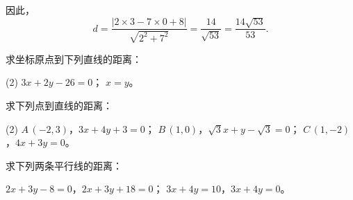 \medskip
因此，
\[
  d=\frac{|2\times3-7\times0+8|}{\sqrt{2^2+7^2}}=\frac{14}{\sqrt{53}}=\frac{14\sqrt{53}}{53}.
\]

\begin{Practice}
  \begin{question}
    \item 求坐标原点到下列直线的距离：
    \begin{tasks}(2)
      \task $3x+2y-26=0$；
      \task $x=y$。
    \end{tasks}
    \item 求下列点到直线的距离：
    \begin{tasks}(2)
      \task $A\,(-2,3)$，$3x+4y+3=0$；
      \task $B\,(1,0)$，$\sqrt{3}x+y-\sqrt{3}=0$；
      \task $C\,(1,-2)$，$4x+3y=0$。
    \end{tasks}
    \item 求下列两条平行线的距离：
    \begin{tasks}
      \task $2x+3y-8=0$，$2x+3y+18=0$；
      \task $3x+4y=10$，$3x+4y=0$。
    \end{tasks}
  \end{question}
\end{Practice}

